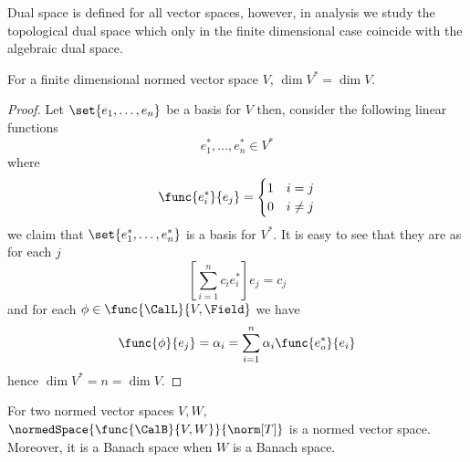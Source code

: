 \begin{remark}
    Dual space is defined for all vector spaces, however, in analysis we study the topological dual space which only in the finite dimensional case coincide with the algebraic dual space.
\end{remark}

\begin{proposition}
    For a finite dimensional normed vector space \(V\), \(\dim V^\ast = \dim V\).
\end{proposition}

\begin{proof}
    Let \(\set{e_1, \dots , e_n}\) be a basis for \(V\) then, consider the following linear functions
    \begin{equation*}
        e^\ast_1, \dots , e^\ast_n \in V^\ast
    \end{equation*}
    where
    \begin{equation*}
        \func{e^\ast_i}{e_j} = \begin{cases}
            1 & i = j    \\
            0 & i \neq j
        \end{cases}
    \end{equation*}
    we claim that \(\set{e^\ast_1, \dots , e^\ast_n}\) is a basis for \(V^\ast\). It is easy to see that they are as for each \(j\)
    \begin{equation*}
        \left[\sum_{i = 1}^n c_i e^\ast_i\right] e_j = c_j
    \end{equation*}
    and for each \(\phi \in \func{\CalL}{V,\Field}\) we have
    \begin{equation*}
        \func{\phi}{e_j} = \alpha_i =  \sum_{i = 1}^n \alpha_i \func{e^\ast_o}{e_i}\\
    \end{equation*}
    hence \(\dim V^\ast = n = \dim V\).
\end{proof}

\begin{theorem}
    For two normed vector spaces \(V,W\), \(\normedSpace{\func{\CalB}{V,W}}{\norm[T]}\) is a normed vector space. Moreover, it is a Banach space when \(W\) is a Banach space.
\end{theorem}


